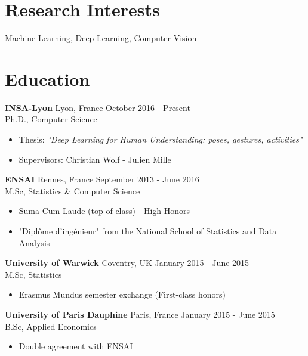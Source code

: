 \documentclass[10pt]{res} %
\begin{document}
\begin{resume}

 
\section{\large Research Interests}  
Machine Learning, Deep Learning, Computer Vision


\section{\large Education}
\textbf{INSA-Lyon} \hfill Lyon, France \hfill October 2016 - Present \\
Ph.D., Computer Science
\begin{itemize}
\item  Thesis: {\sl "Deep Learning for Human Understanding: poses, gestures, activities"}
\item  Supervisors: Christian Wolf - Julien Mille
\end{itemize}


\textbf{ENSAI} \hfill Rennes, France \hfill September 2013 - June 2016 \\
M.Sc, Statistics \& Computer Science
\begin{itemize}
\item Suma Cum Laude (top of class) - High Honors
\item "Diplôme d'ingénieur" from the National School of Statistics and Data Analysis
\end{itemize}

\textbf{University of Warwick} \hfill Coventry, UK \hfill January 2015 - June 2015 \\
M.Sc, Statistics
\begin{itemize}
\item Erasmus Mundus semester exchange (First-class honors)
\end{itemize}

\textbf{University of Paris Dauphine} \hfill Paris, France \hfill January 2015 - June 2015 \\
B.Sc, Applied Economics
\begin{itemize}
\item Double agreement with ENSAI
\end{itemize}


\end{resume}
\end{document}
